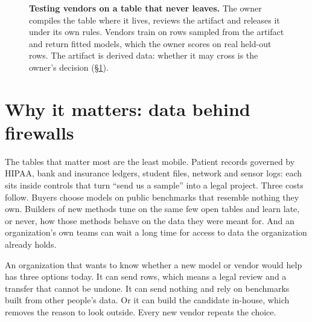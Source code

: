\documentclass[10pt,letterpaper,twocolumn]{article}
\newcommand{\ct}[1]{{\bfseries\color{ink}#1}}   %
\newcommand{\fsfont}{\sffamily\fontsize{6.6}{8.1}\selectfont}
\newcommand{\fs}[1]{{\sffamily\fontsize{6.6}{8.1}\selectfont\color{sub}#1}}              %
\begin{document}
\begin{figure}[t]
\caption{\ct{Testing vendors on a table that never leaves.} The owner compiles the table where it lives, reviews the artifact and releases it under its own rules. Vendors train on rows sampled from the artifact and return fitted models, which the owner scores on real held-out rows. The artifact is derived data: whether it may cross is the owner's decision (\S\ref{sec:why}).}
\label{fig:firewall}
\end{figure}
\section{Why it matters: data behind firewalls}\label{sec:why}
The tables that matter most are the least mobile. Patient records governed by HIPAA, bank and insurance ledgers, student files, network and sensor logs: each sits inside controls that turn ``send us a sample'' into a legal project. Three costs follow. Buyers choose models on public benchmarks that resemble nothing they own. Builders of new methods tune on the same few open tables and learn late, or never, how those methods behave on the data they were meant for. And an organization's own teams can wait a long time for access to data the organization already holds.

An organization that wants to know whether a new model or vendor would help has three options today. It can send rows, which means a legal review and a transfer that cannot be undone. It can send nothing and rely on benchmarks built from other people's data. Or it can build the candidate in-house, which removes the reason to look outside. Every new vendor repeats the choice.
\end{document}
